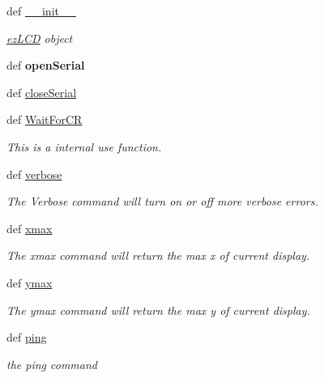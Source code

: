 \begin{DoxyCompactItemize}
\item 
def \hyperlink{namespaceez_l_c_d3xx_a222407eee66a635a2df59ffd7b9c4252}{\-\_\-\-\_\-init\-\_\-\-\_\-}
\begin{DoxyCompactList}\small\item\em \hyperlink{classez_l_c_d3xx_1_1ez_l_c_d}{ez\-L\-C\-D} object \end{DoxyCompactList}\item 
\hypertarget{namespaceez_l_c_d3xx_ae43124104a126749f7775a77e5339ce6}{def {\bfseries open\-Serial}}\label{df/d76/namespaceez_l_c_d3xx_ae43124104a126749f7775a77e5339ce6}

\item 
def \hyperlink{namespaceez_l_c_d3xx_ac758f44d3aa2892d8946d422282c800c}{close\-Serial}
\item 
def \hyperlink{namespaceez_l_c_d3xx_a685d0b172e0c0099f6dda0fbc4d820ad}{Wait\-For\-C\-R}
\begin{DoxyCompactList}\small\item\em This is a internal use function. \end{DoxyCompactList}\item 
def \hyperlink{group___general_gaa497e8573c045944d589b17fd7dd36ac}{verbose}
\begin{DoxyCompactList}\small\item\em The Verbose command will turn on or off more verbose errors. \end{DoxyCompactList}\item 
def \hyperlink{group___general_gabe06f9371514b4556accd06145b9c104}{xmax}
\begin{DoxyCompactList}\small\item\em The xmax command will return the max x of current display. \end{DoxyCompactList}\item 
def \hyperlink{group___general_gabcb8010d7c29b1c514e70cefe3bb856c}{ymax}
\begin{DoxyCompactList}\small\item\em The ymax command will return the max y of current display. \end{DoxyCompactList}\item 
def \hyperlink{group___general_ga92454899475445ff2d48eb7072f3c94e}{ping}
\begin{DoxyCompactList}\small\item\em the ping command \end{DoxyCompactList}\item 

\end{DoxyCompactItemize}
